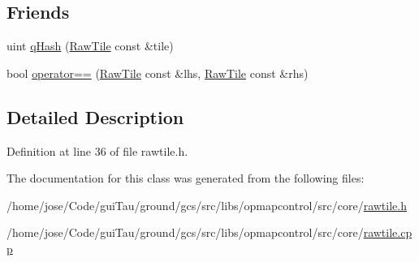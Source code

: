 \subsection*{Friends}
\begin{DoxyCompactItemize}
\item 
uint \hyperlink{group___o_p_map_widget_ga7b7411b1b50d2977c787264eb948910a}{q\-Hash} (\hyperlink{classcore_1_1_raw_tile}{Raw\-Tile} const \&tile)
\item 
bool \hyperlink{group___o_p_map_widget_ga7b53343b44511baed2e1587fdd5c88aa}{operator==} (\hyperlink{classcore_1_1_raw_tile}{Raw\-Tile} const \&lhs, \hyperlink{classcore_1_1_raw_tile}{Raw\-Tile} const \&rhs)
\end{DoxyCompactItemize}


\subsection{Detailed Description}


Definition at line 36 of file rawtile.\-h.



The documentation for this class was generated from the following files\-:\begin{DoxyCompactItemize}
\item 
/home/jose/\-Code/gui\-Tau/ground/gcs/src/libs/opmapcontrol/src/core/\hyperlink{rawtile_8h}{rawtile.\-h}\item 
/home/jose/\-Code/gui\-Tau/ground/gcs/src/libs/opmapcontrol/src/core/\hyperlink{rawtile_8cpp}{rawtile.\-cpp}\end{DoxyCompactItemize}
